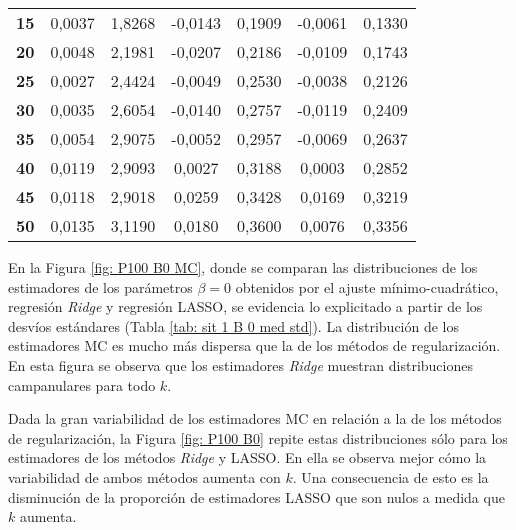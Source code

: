 \documentclass[a4paper,12pt]{report}
\begin{document}
\begin{table}[H]
\begin{tabular}{c|cc|cc|cc}
\textbf{15} & \hspace{0.005cm} 0,0037 & 1,8268 & -0,0143 & 0,1909 & -0,0061 & 0,1330 \\
\textbf{20} & \hspace{0.005cm} 0,0048 & 2,1981 & -0,0207 & 0,2186 & -0,0109 & 0,1743 \\
\textbf{25} & \hspace{0.005cm} 0,0027 & 2,4424 & -0,0049 & 0,2530 & -0,0038 & 0,2126 \\
\textbf{30} & \hspace{0.005cm} 0,0035 & 2,6054 & -0,0140 & 0,2757 & -0,0119 & 0,2409 \\
\textbf{35} & \hspace{0.005cm} 0,0054 & 2,9075 & -0,0052 & 0,2957 & -0,0069 & 0,2637 \\
\textbf{40} & \hspace{0.005cm} 0,0119 & 2,9093 & \hspace{0.005cm} 0,0027 & 0,3188 & \hspace{0.005cm} 0,0003 & 0,2852 \\
\textbf{45} & \hspace{0.005cm} 0,0118 & 2,9018 & \hspace{0.005cm} 0,0259 & 0,3428 & \hspace{0.005cm} 0,0169 & 0,3219 \\
\textbf{50} & \hspace{0.005cm} 0,0135 & 3,1190 & \hspace{0.005cm} 0,0180 & 0,3600 & \hspace{0.005cm} 0,0076 & 0,3356
\end{tabular}
\end{table}

En la Figura \ref{fig: P100 B0 MC}, donde se comparan las distribuciones de los estimadores de los parámetros $\beta=0$ obtenidos por el ajuste mínimo-cuadrático, regresión \textit{Ridge} y regresión LASSO, se evidencia lo explicitado a partir de los desvíos estándares (Tabla \ref{tab: sit 1 B 0 med std}). La distribución de los estimadores MC es mucho más dispersa que la de los métodos de regularización. En esta figura se observa que los estimadores \textit{Ridge} muestran distribuciones campanulares para todo $k$.

Dada la gran variabilidad de los estimadores MC en relación a la de los métodos de regularización, la Figura \ref{fig: P100 B0} repite estas distribuciones sólo para los estimadores de los métodos \textit{Ridge} y LASSO. En ella se observa mejor cómo la variabilidad de ambos métodos aumenta con $k$. Una consecuencia de esto es la disminución de la proporción de estimadores LASSO que son nulos a medida que $k$ aumenta.
\end{document}
